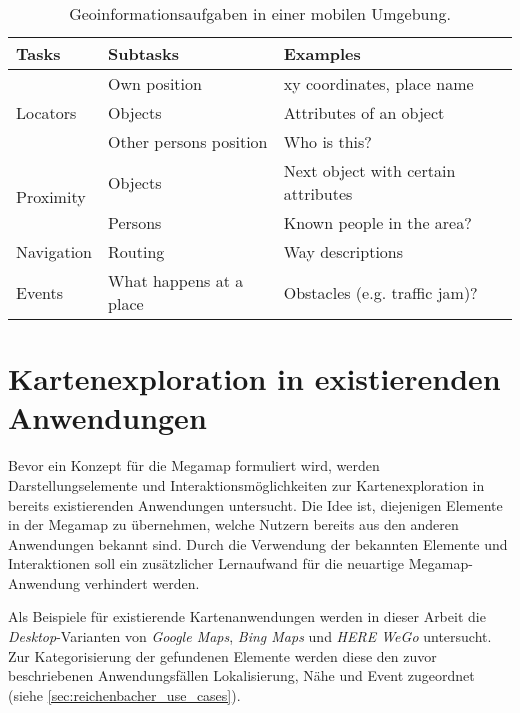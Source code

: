 \begin{table}[tbh]
    \centering
    \caption{Geoinformationsaufgaben in einer mobilen Umgebung. }
    \label{tab:gis_user_tasks}
    \begin{tabular}{@{}lll@{}}\toprule
        \textsf{\textbf{Tasks}} & \textsf{\textbf{Subtasks}} & \textsf{\textbf{Examples}}\\ \midrule
        \multirow{3}{*}{Locators} & Own position & xy coordinates, place name \\
                                  & Objects & Attributes of an object\\
                                  & Other persons position & Who is this?\\ \midrule
        \multirow{2}{*}{Proximity} & Objects & Next object with certain attributes\\
                                   & Persons & Known people in the area?\\ \midrule
        Navigation & Routing & Way descriptions\\ \midrule
        Events & What happens at a place & Obstacles (e.g. traffic jam)?\\ \bottomrule
    \end{tabular}
    \vspace{0.5em}
\end{table}

\section{Kartenexploration in existierenden Anwendungen}
Bevor ein Konzept für die Megamap formuliert wird, werden Darstellungselemente und Interaktionsmöglichkeiten zur Kartenexploration in bereits existierenden Anwendungen untersucht.
Die Idee ist, diejenigen Elemente in der Megamap zu übernehmen, welche Nutzern bereits aus den anderen Anwendungen bekannt sind.
Durch die Verwendung der bekannten Elemente und Interaktionen soll ein zusätzlicher Lernaufwand für die neuartige Megamap-Anwendung verhindert werden.

Als Beispiele für existierende Kartenanwendungen werden in dieser Arbeit die \emph{Desktop}-Varianten von \emph{Google Maps}, \emph{Bing Maps} \parencite{Microsoft2018b} und \emph{HERE WeGo} \parencite{HERE2018} untersucht.
Zur Kategorisierung der gefundenen Elemente werden diese den zuvor beschriebenen Anwendungsfällen Lokalisierung, Nähe und Event zugeordnet (siehe \autoref{sec:reichenbacher_use_cases}).

